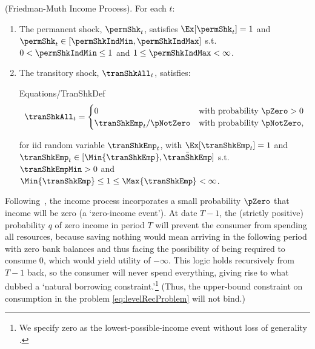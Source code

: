 \documentclass[BufferStockTheory]{subfiles}
\begin{document}
\begin{assumI}\label{ass:shocks}(Friedman-Muth Income Process).
For each $t$:
\begin{enumerate}
\item The permanent shock, $\permShk_{t}$, satisfies $\Ex[{\permShk}_{t}]=1$ and  $\permShk_{t}\in [\permShkIndMin,\permShkIndMax]$ s.t. $0 < \permShkIndMin \leq 1$ and $1 \leq \permShkIndMax < \infty$. 
\item The transitory shock, $\tranShkAll_{t}$, satisfies: 
\begin{verbatimwrite}{Equations/TranShkDef}
  \begin{equation}
    \tranShkAll_{t}=
    \begin{cases}
      0\phantom{_{t+1}/\pNotZero} & \text{with probability $\pZero > 0$} \\
      \tranShkEmp_{t}/\pNotZero      & \text{with probability $\pNotZero  $}, %
    \end{cases} \label{eq:TranShkDef}
  \end{equation}
\end{verbatimwrite}

\noindent for iid random variable $\tranShkEmp_{t}$,  with $\Ex[{\tranShkEmp}_{t}]=1$ and $ \tranShkEmp_{t} \in [\Min{\tranShkEmp}, \bar{\tranShkEmp}]$ s.t. $\tranShkEmpMin >0$ and $\Min{\tranShkEmp} \leq 1 \leq \Max{\tranShkEmp} < \infty$.

\end{enumerate} 
\end{assumI}

Following~\cite{zeldesStochastic}, the income process incorporates a small probability $\pZero$ that income will be zero (a `zero-income event').
At date $T-1$, the (strictly positive) probability $q$ of zero income in period $T$ will prevent the consumer from spending all resources, because saving nothing would mean arriving in the following period with zero bank balances and thus facing the possibility of being required to consume 0, which would yield utility of $-\infty$.
This logic holds recursively from $T-1$ back, so  the consumer will never spend everything, giving rise to what \cite{aiyagari:ge} dubbed a `natural borrowing constraint.'\footnote{We specify zero as the lowest-possible-income event without loss of generality \citep{aiyagari:ge}.} (Thus, the upper-bound constraint on consumption in the problem \eqref{eq:levelRecProblem} will not bind.)


\hypertarget{PDV}{}
\end{document}
